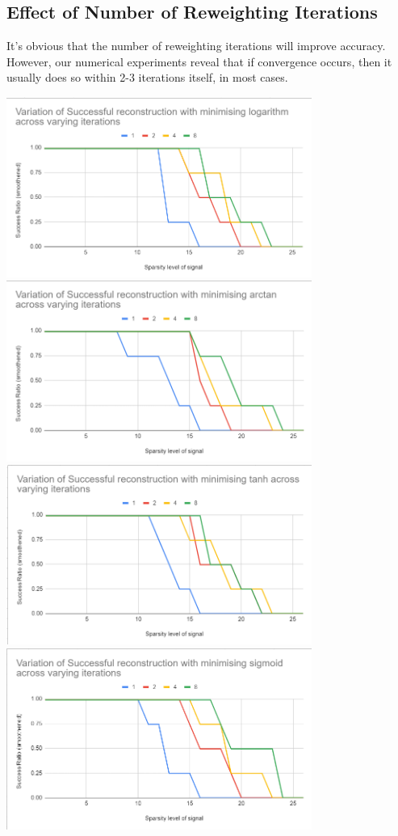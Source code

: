 \documentclass[a4paper,14pt]{article}
\numberwithin{definition}{section}
\numberwithin{mytheorem}{subsection}
\begin{document}
\subsection{Effect of Number of Reweighting Iterations}
It's obvious that the number of reweighting iterations will improve accuracy. However, our numerical experiments reveal that if convergence occurs, then it usually does so within 2-3 iterations itself, in most cases.

\begin{center}
    \includegraphics[width=10cm]{log_iterations.png}
    \includegraphics[width=10cm]{atan_iterations.png}
    \includegraphics[width=10cm]{tanh_iterations.png}
    \includegraphics[width=10cm]{sigmoid_iterations.png}
\end{center}
\end{document}
